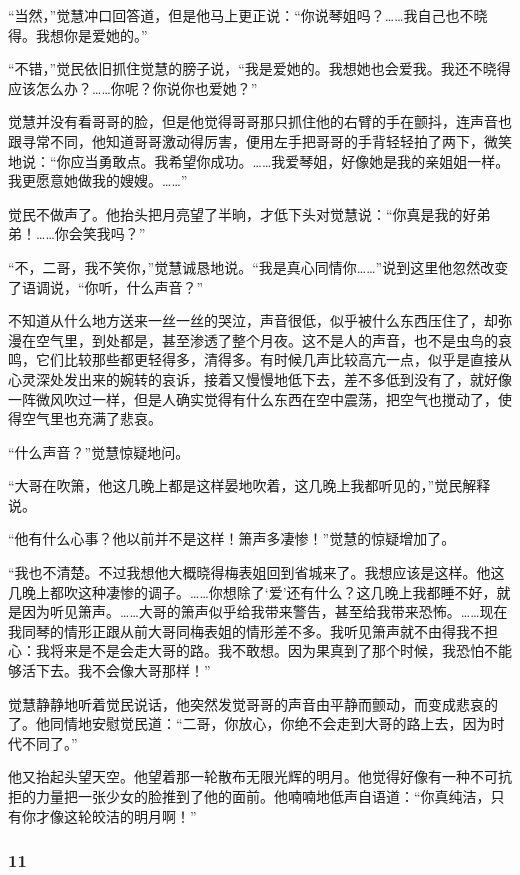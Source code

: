 \par “当然，”觉慧冲口回答道，但是他马上更正说：“你说琴姐吗？……我自己也不晓得。我想你是爱她的。”
\par “不错，”觉民依旧抓住觉慧的膀子说，“我是爱她的。我想她也会爱我。我还不晓得应该怎么办？……你呢？你说你也爱她？”
\par 觉慧并没有看哥哥的脸，但是他觉得哥哥那只抓住他的右臂的手在颤抖，连声音也跟寻常不同，他知道哥哥激动得厉害，便用左手把哥哥的手背轻轻拍了两下，微笑地说：“你应当勇敢点。我希望你成功。……我爱琴姐，好像她是我的亲姐姐一样。我更愿意她做我的嫂嫂。……”
\par 觉民不做声了。他抬头把月亮望了半晌，才低下头对觉慧说：“你真是我的好弟弟！……你会笑我吗？”
\par “不，二哥，我不笑你，”觉慧诚恳地说。“我是真心同情你……”说到这里他忽然改变了语调说，“你听，什么声音？”
\par 不知道从什么地方送来一丝一丝的哭泣，声音很低，似乎被什么东西压住了，却弥漫在空气里，到处都是，甚至渗透了整个月夜。这不是人的声音，也不是虫鸟的哀鸣，它们比较那些都更轻得多，清得多。有时候几声比较高亢一点，似乎是直接从心灵深处发出来的婉转的哀诉，接着又慢慢地低下去，差不多低到没有了，就好像一阵微风吹过一样，但是人确实觉得有什么东西在空中震荡，把空气也搅动了，使得空气里也充满了悲哀。
\par “什么声音？”觉慧惊疑地问。
\par “大哥在吹箫，他这几晚上都是这样晏地吹着，这几晚上我都听见的，”觉民解释说。
\par “他有什么心事？他以前并不是这样！箫声多凄惨！”觉慧的惊疑增加了。
\par “我也不清楚。不过我想他大概晓得梅表姐回到省城来了。我想应该是这样。他这几晚上都吹这种凄惨的调子。……你想除了‘爱’还有什么？这几晚上我都睡不好，就是因为听见箫声。……大哥的箫声似乎给我带来警告，甚至给我带来恐怖。……现在我同琴的情形正跟从前大哥同梅表姐的情形差不多。我听见箫声就不由得我不担心：我将来是不是会走大哥的路。我不敢想。因为果真到了那个时候，我恐怕不能够活下去。我不会像大哥那样！”
\par 觉慧静静地听着觉民说话，他突然发觉哥哥的声音由平静而颤动，而变成悲哀的了。他同情地安慰觉民道：“二哥，你放心，你绝不会走到大哥的路上去，因为时代不同了。”
\par 他又抬起头望天空。他望着那一轮散布无限光辉的明月。他觉得好像有一种不可抗拒的力量把一张少女的脸推到了他的面前。他喃喃地低声自语道：“你真纯洁，只有你才像这轮皎洁的明月啊！”


\subsubsection*{11}


